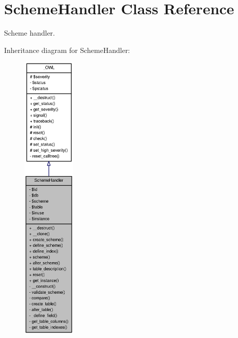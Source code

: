 \section{SchemeHandler Class Reference}
\label{classSchemeHandler}


Scheme handler.  




Inheritance diagram for SchemeHandler:\nopagebreak
\begin{figure}[H]
\begin{center}
\leavevmode
\includegraphics[height=400pt]{classSchemeHandler__inherit__graph}
\end{center}
\end{figure}


